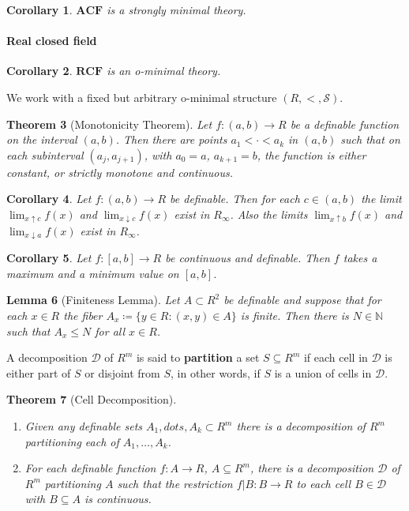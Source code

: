 \documentclass{amsart}
\newtheorem{theorem}{Theorem}[section]
\newtheorem{lemma}[theorem]{Lemma}
\newtheorem{corollary}[theorem]{Corollary}
\theoremstyle{definition}
\numberwithin{equation}{section}
\begin{document}
\begin{corollary}
    $\mathbf{ACF}$ is a strongly minimal theory.
\end{corollary}

\paragraph{Real closed field}

\begin{corollary}
    $\mathbf{RCF}$ is an o-minimal theory.
\end{corollary}

We work with a fixed but arbitrary o-minimal structure $(R,<,\mathcal{S})$.

\begin{theorem}[Monotonicity Theorem]
    Let $f: (a,b)\to R$ be a definable function on the interval $(a,b)$.
    Then there are points $a_1 < \cdot < a_k$ in $(a,b)$ such that on each subinterval $(a_j,a_{j+1})$,
    with $a_0 = a$, $a_{k+1} = b$,
    the function is either constant, or strictly monotone and continuous.
\end{theorem}

\begin{corollary}
    Let $f: (a,b) \to R$ be definable.
    Then for each $c\in (a,b)$ the limit $\lim_{x\uparrow c}f(x)$
    and $\lim_{x\downarrow c}f(x)$ exist in $R_{\infty}$.
    Also the limits $\lim_{x\uparrow b}f(x)$ and $\lim_{x\downarrow a}f(x)$ exist in $R_{\infty}$.
\end{corollary}

\begin{corollary}
    Let $f: [a,b]\to R$ be continuous and definable.
    Then $f$ takes a maximum and a minimum value on $[a,b]$.
\end{corollary}

\begin{lemma}[Finiteness Lemma]
    Let $A \subset R^2$ be definable and suppose that for each $x\in R$
    the fiber $A_x \coloneq \{y\in R\colon (x,y)\in A\}$ is finite.
    Then there is $N \in \mathbb{N}$ such that $A_x \le N$ for all $x\in R$.
\end{lemma}

A decomposition $\mathcal{D}$ of $R^m$ is said to \textbf{partition}
a set $S \subseteq R^m$ if each cell in $\mathcal{D}$ is
either part of $S$ or disjoint from $S$,
in other words, if $S$ is a union of cells in $\mathcal{D}$.
\begin{theorem}[Cell Decomposition]
    \hfill
    \begin{enumerate}[label = {$\mathrm{(\Roman*_{m})}$}]
        \item Given any definable sets $A_1,dots,A_k \subset R^m$ there is a decomposition of $R^m$ partitioning each of $A_1,\dots,A_k$.
        \item For each definable function $f: A \to R$, $A \subseteq R^m$,
        there is a decomposition $\mathcal{D}$ of $R^m$ partitioning $A$ such that 
        the restriction $f|B: B \to R$ to each cell $B \in \mathcal{D}$ with $B \subseteq A$ is continuous.
    \end{enumerate}
\end{theorem}
\end{document}
